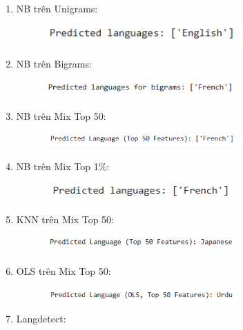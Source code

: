 \begin{enumerate}
    \item NB trên Unigrams:
    \begin{figure}[H]
    \centering
    \includegraphics[width=0.7\textwidth]{img/docspics/Picture78.png}
\end{figure}
    \item NB trên Bigrams:
    \begin{figure}[H]
    \centering
    \includegraphics[width=0.7\textwidth]{img/docspics/Picture79.png}
\end{figure}
    \item NB trên Mix Top 50:
    \begin{figure}[H]
    \centering
    \includegraphics[width=0.7\textwidth]{img/docspics/Picture80.png}
\end{figure}
    \item NB trên Mix Top 1\%:
    \begin{figure}[H]
    \centering
    \includegraphics[width=0.7\textwidth]{img/docspics/Picture81.png}
\end{figure}
    \item KNN trên Mix Top 50:
    \begin{figure}[H]
    \centering
    \includegraphics[width=0.7\textwidth]{img/docspics/Picture82.png}
\end{figure}
    \item OLS trên Mix Top 50:
    \begin{figure}[H]
    \centering
    \includegraphics[width=0.7\textwidth]{img/docspics/Picture83.png}
\end{figure}
    \item Langdetect:

\end{enumerate}
